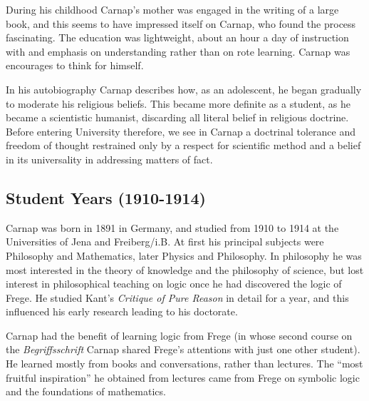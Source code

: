 \documentclass[10pt,titlepage]{book}
\begin{document}
During his childhood Carnap's mother was engaged in the writing of a large book, and this seems to have impressed itself on Carnap, who found the process fascinating.
The education was lightweight, about an hour a day of instruction with and emphasis on understanding rather than on rote learning.
Carnap was encourages to think for himself.

In his autobiography Carnap describes how, as an adolescent, he began gradually to moderate his religious beliefs.
This became more definite as a student, as he became a scientistic humanist, discarding all literal belief in religious doctrine.
Before entering University therefore, we see in Carnap a doctrinal tolerance and freedom of thought restrained only by a respect for scientific method and a belief in its universality in addressing matters of fact.

\subsection{Student Years (1910-1914)}

Carnap was born in 1891 in Germany, and studied from 1910 to 1914 at the Universities of Jena and Freiberg/i.B.
At first his principal subjects were Philosophy and Mathematics, later Physics and Philosophy.
In philosophy he was most interested in the theory of knowledge and the philosophy of science, but lost interest in philosophical teaching on logic once he had discovered the logic of Frege.
He studied Kant's \emph{Critique of Pure Reason} in detail for a year, and this influenced his early research leading to his doctorate.

Carnap had the benefit of learning logic from Frege (in whose second course on the {\it Begriffsschrift} Carnap shared Frege's attentions with just one other student).
He learned mostly from books and conversations, rather than lectures.
The ``most fruitful inspiration'' he obtained from lectures came from Frege on symbolic logic and the foundations of mathematics.
\end{document}
